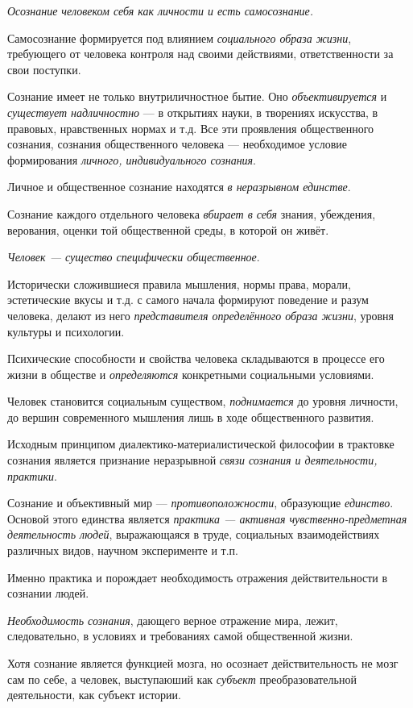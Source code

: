 \documentclass[a4paper,14pt,russian]{extreport}
\begin{document}
\emph{Осознание человеком себя как личности и есть самосознание.}

Самосознание формируется под влиянием \emph{социального образа жизни}, требующего от человека контроля над своими действиями, ответственности за свои поступки.

Сознание имеет не только внутриличностное бытие. Оно \emph{объективируется} и \emph{существует надличностно} --- в открытиях науки, в творениях искусства, в правовых, нравственных нормах и т.д. Все эти проявления общественного сознания, сознания общественного человека --- необходимое условие формирования \emph{личного, индивидуального сознания}.

Личное и общественное сознание находятся \emph{в неразрывном единстве}.

Сознание каждого отдельного человека \emph{вбирает в себя} знания, убеждения, верования, оценки той общественной среды, в которой он живёт.

\emph{Человек --- существо специфически общественное}.

Исторически сложившиеся правила мышления, нормы права, морали, эстетические вкусы и т.д. с самого начала формируют поведение и разум человека, делают из него \emph{представителя определённого образа жизни}, уровня культуры и психологии.

Психические способности и свойства человека складываются в процессе его жизни в обществе и \emph{определяются} конкретными социальными условиями.

Человек становится социальным существом, \emph{поднимается} до уровня личности, до вершин современного мышления лишь в ходе общественного развития.

Исходным принципом диалектико-материалистической философии в трактовке сознания является признание неразрывной \emph{связи сознания и деятельности, практики}.

Сознание и объективный мир --- \emph{противоположности}, образующие \emph{единство}. Основой этого единства является \emph{практика --- активная чувственно-предметная деятельность людей}, выражающаяся в труде, социальных взаимодействиях различных видов, научном эксперименте и т.п.

Именно практика и порождает необходимость отражения действительности в сознании людей.

\emph{Необходимость сознания}, дающего верное отражение мира, лежит, следовательно, в условиях и требованиях самой общественной жизни.

Хотя сознание является функцией мозга, но осознает действительность не мозг сам по себе, а человек, выступаюший как \emph{субъект} преобразовательной деятельности, как субъект истории.
\end{document}
